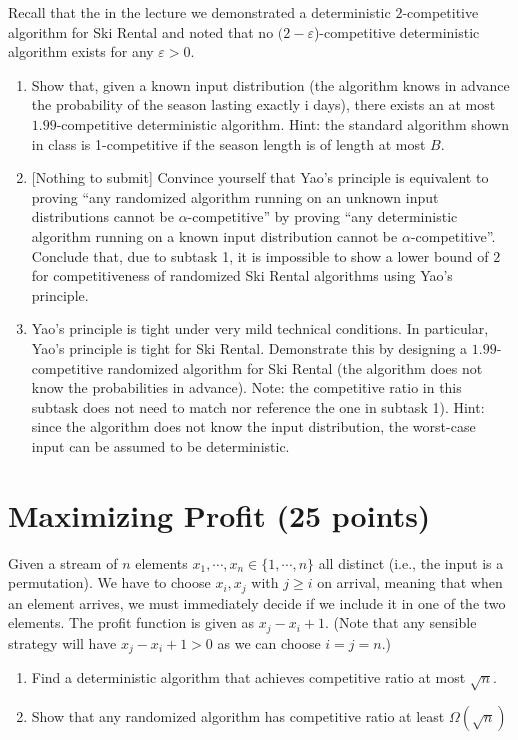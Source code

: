 \documentclass[11pt]{article}
\begin{document}
Recall that the in the lecture we demonstrated a deterministic $2$-competitive algorithm for Ski Rental and noted that no $(2 - \varepsilon$)-competitive deterministic algorithm exists for any $\varepsilon > 0$.
\begin{enumerate}
\item Show that, given a known input distribution (the algorithm knows in advance the probability of the season lasting exactly i days), there exists an at most $1.99$-competitive deterministic algorithm. Hint: the standard algorithm shown in class is 1-competitive if the season length is of length at most $B$.
\item{} [Nothing to submit] Convince yourself that Yao's principle is equivalent to proving ``any randomized algorithm running on an unknown input distributions cannot be $\alpha$-competitive'' by proving ``any deterministic algorithm running on a known input distribution cannot be $\alpha$-competitive''. Conclude that, due to subtask 1, it is impossible to show a lower bound of $2$ for competitiveness of randomized Ski Rental algorithms using Yao's principle. 
\item Yao's principle is tight under very mild technical conditions. In particular, Yao's principle is tight for Ski Rental. Demonstrate this by designing a $1.99$-competitive randomized algorithm for Ski Rental (the algorithm does not know the probabilities in advance). Note: the competitive ratio in this subtask does not need to match nor reference the one in subtask 1). Hint: since the algorithm does not know the input distribution, the worst-case input can be assumed to be deterministic.
\end{enumerate}

\section{Maximizing Profit (25 points)}
Given a stream of $n$ elements $x_1, \cdots, x_n \in \{1,\cdots,n\}$ all distinct (i.e., the input is a permutation). We have to choose $x_i, x_j$ with $j\geq i$ on arrival, meaning that when an element arrives, we must immediately decide if we include it in one of the two elements. The profit function is given as $x_j-x_i+1$. (Note that any sensible strategy will have $x_j-x_i+1 >0$ as we can choose $i=j=n$.)
\begin{enumerate}
    \item Find a deterministic algorithm that achieves competitive ratio at most $\sqrt{n}$.
    \item Show that any randomized algorithm has competitive ratio at least $\Omega(\sqrt{n})$
\end{enumerate}
\end{document}
